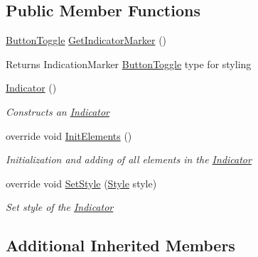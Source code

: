 \subsection*{Public Member Functions}
\begin{DoxyCompactItemize}
\item 
\mbox{\label{class_space_v_i_l_1_1_indicator_a7b4f51c939bd3de42bb343f374e4efa1}} 
\mbox{\hyperlink{class_space_v_i_l_1_1_button_toggle}{Button\+Toggle}} \mbox{\hyperlink{class_space_v_i_l_1_1_indicator_a7b4f51c939bd3de42bb343f374e4efa1}{Get\+Indicator\+Marker}} ()
\begin{DoxyCompactList}\small\item\em \begin{DoxyReturn}{Returns}
Indication\+Marker \mbox{\hyperlink{class_space_v_i_l_1_1_button_toggle}{Button\+Toggle}} type for styling 
\end{DoxyReturn}
\end{DoxyCompactList}\item 
\mbox{\hyperlink{class_space_v_i_l_1_1_indicator_a2601a19d889e39b36100e015843001c8}{Indicator}} ()
\begin{DoxyCompactList}\small\item\em Constructs an \mbox{\hyperlink{class_space_v_i_l_1_1_indicator}{Indicator}} \end{DoxyCompactList}\item 
override void \mbox{\hyperlink{class_space_v_i_l_1_1_indicator_a787de3f581ef112a306781a4a9722fb5}{Init\+Elements}} ()
\begin{DoxyCompactList}\small\item\em Initialization and adding of all elements in the \mbox{\hyperlink{class_space_v_i_l_1_1_indicator}{Indicator}} \end{DoxyCompactList}\item 
override void \mbox{\hyperlink{class_space_v_i_l_1_1_indicator_aa9233e9dda656a3634bcc3ace59c00dc}{Set\+Style}} (\mbox{\hyperlink{class_space_v_i_l_1_1_decorations_1_1_style}{Style}} style)
\begin{DoxyCompactList}\small\item\em Set style of the \mbox{\hyperlink{class_space_v_i_l_1_1_indicator}{Indicator}} \end{DoxyCompactList}\end{DoxyCompactItemize}
\subsection*{Additional Inherited Members}


